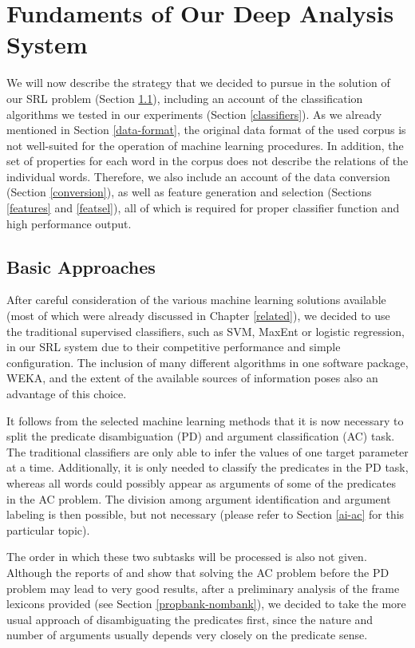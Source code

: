 \documentclass[12pt,notitlepage]{report}
\begin{document}
%
%
\chapter{Fundaments of Our Deep Analysis System}\label{ml-semantic}
%
%

We will now describe the strategy that we decided to pursue in the solution of our SRL problem (Section \ref{approach}), including an account of the classification algorithms we tested in our experiments (Section \ref{classifiers}). As we already mentioned in Section \ref{data-format}, the original data format of the used corpus is not well-suited for the operation of machine learning procedures. In addition, the set of properties for each word in the corpus does not describe the relations of the individual words. Therefore, we also include an account of the data conversion (Section \ref{conversion}), as well as feature generation and selection (Sections \ref{features} and \ref{featsel}), all of which is required for proper classifier function and high performance output.

\section{Basic Approaches}\label{approach}

After careful consideration of the various machine learning solutions available (most of which were already discussed in Chapter \ref{related}), we decided to use the traditional supervised classifiers, such as SVM, MaxEnt or logistic regression, in our SRL system due to their competitive performance and simple configuration. The inclusion of many different algorithms in one software package, WEKA, and the extent of the available sources of information poses also an advantage of this choice.

It follows from the selected machine learning methods that it is now necessary to split the predicate disambiguation (PD) and argument classification (AC) task. The traditional classifiers are only able to infer the values of one target parameter at a time. Additionally, it is only needed to classify the predicates in the PD task, whereas all words could possibly appear as arguments of some of the predicates in the AC problem. The division among argument identification and argument labeling is then possible, but not necessary (please refer to Section \ref{ai-ac} for this particular topic). 

The order in which these two subtasks will be processed is also not given. Although the reports of \citet{bohnet09} and \citet{zhao09} show that solving the AC problem before the PD problem may lead to very good results, after a preliminary analysis of the frame lexicons provided (see Section \ref{propbank-nombank}), we decided to take the more usual approach of disambiguating the predicates first, since the nature and number of arguments usually depends very closely on the predicate sense.
\end{document}

